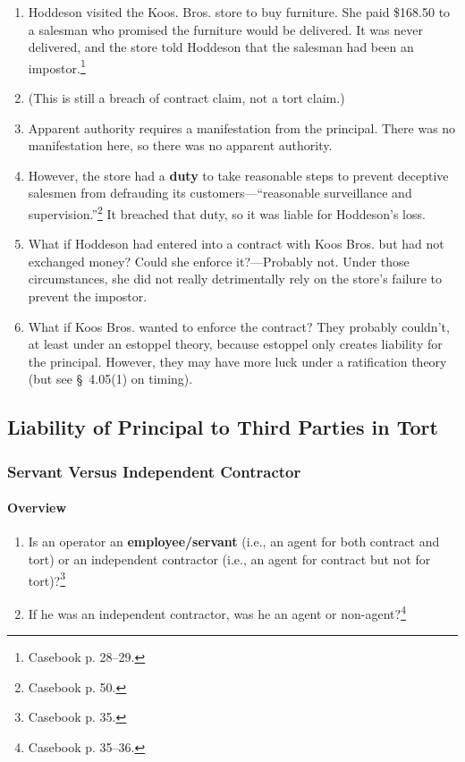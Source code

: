 \begin{enumerate}
    \item Hoddeson visited the Koos. Bros. store to buy furniture. She paid 
    \$168.50 to a salesman who promised the furniture would be delivered. It 
    was never delivered, and the store told Hoddeson that the salesman had 
    been an impostor.\footnote{Casebook p. 28--29.}
    \item (This is still a breach of contract claim, not a tort claim.)
    \item Apparent authority requires a manifestation from the principal. 
    There was no manifestation here, so there was no apparent authority.
    \item However, the store had a \textbf{duty} to take reasonable steps to 
    prevent deceptive salesmen from defrauding its customers---``reasonable 
    surveillance and supervision.''\footnote{Casebook p. 50.} It breached that 
    duty, so it was liable for Hoddeson's loss.
    \item What if Hoddeson had entered into a contract with Koos Bros. but had 
    not exchanged money? Could she enforce it?---Probably not. Under those 
    circumstances, she did not really detrimentally rely on the store's 
    failure to prevent the impostor.
    \item What if Koos Bros. wanted to enforce the contract? They probably 
    couldn't, at least under an estoppel theory, because estoppel only creates 
    liability for the principal. However, they may have more luck under a 
    ratification theory (but see \S\ 4.05(1) on timing).
\end{enumerate}

\subsection{Liability of Principal to Third Parties in Tort}

\subsubsection{Servant Versus Independent Contractor}

\paragraph{Overview}

\begin{enumerate}
    \item Is an operator an \textbf{employee/servant} (i.e., an agent for both 
    contract and tort) or an independent contractor (i.e., an agent for 
    contract but not for tort)?\footnote{Casebook p. 35.}
    \item If he was an independent contractor, was he an agent or 
    non-agent?\footnote{Casebook p. 35--36.}
\end{enumerate}


